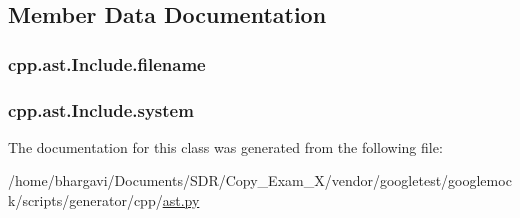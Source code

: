 \subsection{Member Data Documentation}
\subsubsection[{\texorpdfstring{filename}{filename}}]{\setlength{\rightskip}{0pt plus 5cm}cpp.\+ast.\+Include.\+filename}\hypertarget{classcpp_1_1ast_1_1_include_a9ecff64f127655d3c17e9abe4ebe3852}{}\label{classcpp_1_1ast_1_1_include_a9ecff64f127655d3c17e9abe4ebe3852}
\subsubsection[{\texorpdfstring{system}{system}}]{\setlength{\rightskip}{0pt plus 5cm}cpp.\+ast.\+Include.\+system}\hypertarget{classcpp_1_1ast_1_1_include_a2e8e535b1af7d9b0ff94d0ae9f86e5c5}{}\label{classcpp_1_1ast_1_1_include_a2e8e535b1af7d9b0ff94d0ae9f86e5c5}


The documentation for this class was generated from the following file\+:\begin{DoxyCompactItemize}
\item 
/home/bhargavi/\+Documents/\+S\+D\+R/\+Copy\+\_\+\+Exam\+\_\+X/vendor/googletest/googlemock/scripts/generator/cpp/\hyperlink{ast_8py}{ast.\+py}\end{DoxyCompactItemize}
